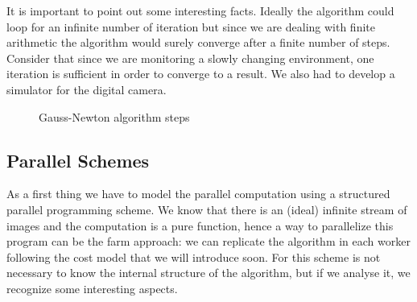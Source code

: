 It is important to point out some interesting facts.
Ideally the algorithm could loop for an infinite number of iteration but since we are dealing with finite arithmetic the algorithm would surely converge after a finite number of steps.
Consider that since we are monitoring a slowly changing environment, one iteration is sufficient in order to converge to a result.
We also had to develop a simulator for the digital camera.
\begin{figure}[h]
\centering
{}
\caption{Gauss-Newton algorithm steps}
\end{figure}
\subsection{Parallel Schemes}

As a first thing we have to model the parallel computation using a structured parallel programming scheme. We know that there is an (ideal) infinite stream of images and the computation is a pure function, hence a way to parallelize this program can be the farm approach: we can replicate the algorithm in each worker following the cost model that we will introduce soon. For this scheme is not necessary to know the internal structure of the algorithm, but if we analyse it, we recognize some interesting aspects.


